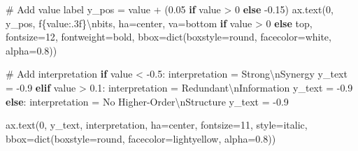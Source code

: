 \documentclass[
  11pt,
  letterpaper,
  oneside,
  openany]{book}
\newenvironment{Shaded}{\begin{snugshade}}{\end{snugshade}}
\newcommand{\BuiltInTok}[1]{\textcolor[rgb]{0.00,0.23,0.31}{#1}}
\newcommand{\CharTok}[1]{\textcolor[rgb]{0.13,0.47,0.30}{#1}}
\newcommand{\CommentTok}[1]{\textcolor[rgb]{0.37,0.37,0.37}{#1}}
\newcommand{\ControlFlowTok}[1]{\textcolor[rgb]{0.00,0.23,0.31}{\textbf{#1}}}
\newcommand{\DecValTok}[1]{\textcolor[rgb]{0.68,0.00,0.00}{#1}}
\newcommand{\FloatTok}[1]{\textcolor[rgb]{0.68,0.00,0.00}{#1}}
\newcommand{\NormalTok}[1]{\textcolor[rgb]{0.00,0.23,0.31}{#1}}
\newcommand{\OperatorTok}[1]{\textcolor[rgb]{0.37,0.37,0.37}{#1}}
\newcommand{\SpecialCharTok}[1]{\textcolor[rgb]{0.37,0.37,0.37}{#1}}
\newcommand{\SpecialStringTok}[1]{\textcolor[rgb]{0.13,0.47,0.30}{#1}}
\newcommand{\StringTok}[1]{\textcolor[rgb]{0.13,0.47,0.30}{#1}}
\begin{document}
\begin{Shaded}
\begin{Highlighting}[]
    \CommentTok{\# Add value label}
\NormalTok{    y\_pos }\OperatorTok{=}\NormalTok{ value }\OperatorTok{+}\NormalTok{ (}\FloatTok{0.05} \ControlFlowTok{if}\NormalTok{ value }\OperatorTok{\textgreater{}} \DecValTok{0} \ControlFlowTok{else} \OperatorTok{{-}}\FloatTok{0.15}\NormalTok{)}
\NormalTok{    ax.text(}\DecValTok{0}\NormalTok{, y\_pos, }\SpecialStringTok{f\textquotesingle{}}\SpecialCharTok{\{}\NormalTok{value}\SpecialCharTok{:.3f\}}\CharTok{\textbackslash{}n}\SpecialStringTok{bits\textquotesingle{}}\NormalTok{, ha}\OperatorTok{=}\StringTok{\textquotesingle{}center\textquotesingle{}}\NormalTok{, va}\OperatorTok{=}\StringTok{\textquotesingle{}bottom\textquotesingle{}} \ControlFlowTok{if}\NormalTok{ value }\OperatorTok{\textgreater{}} \DecValTok{0} \ControlFlowTok{else} \StringTok{\textquotesingle{}top\textquotesingle{}}\NormalTok{,}
\NormalTok{            fontsize}\OperatorTok{=}\DecValTok{12}\NormalTok{, fontweight}\OperatorTok{=}\StringTok{\textquotesingle{}bold\textquotesingle{}}\NormalTok{,}
\NormalTok{            bbox}\OperatorTok{=}\BuiltInTok{dict}\NormalTok{(boxstyle}\OperatorTok{=}\StringTok{\textquotesingle{}round\textquotesingle{}}\NormalTok{, facecolor}\OperatorTok{=}\StringTok{\textquotesingle{}white\textquotesingle{}}\NormalTok{, alpha}\OperatorTok{=}\FloatTok{0.8}\NormalTok{))}
    
    \CommentTok{\# Add interpretation}
    \ControlFlowTok{if}\NormalTok{ value }\OperatorTok{\textless{}} \OperatorTok{{-}}\FloatTok{0.5}\NormalTok{:}
\NormalTok{        interpretation }\OperatorTok{=} \StringTok{\textquotesingle{}Strong}\CharTok{\textbackslash{}n}\StringTok{Synergy\textquotesingle{}}
\NormalTok{        y\_text }\OperatorTok{=} \OperatorTok{{-}}\FloatTok{0.9}
    \ControlFlowTok{elif}\NormalTok{ value }\OperatorTok{\textgreater{}} \FloatTok{0.1}\NormalTok{:}
\NormalTok{        interpretation }\OperatorTok{=} \StringTok{\textquotesingle{}Redundant}\CharTok{\textbackslash{}n}\StringTok{Information\textquotesingle{}}
\NormalTok{        y\_text }\OperatorTok{=} \OperatorTok{{-}}\FloatTok{0.9}
    \ControlFlowTok{else}\NormalTok{:}
\NormalTok{        interpretation }\OperatorTok{=} \StringTok{\textquotesingle{}No Higher{-}Order}\CharTok{\textbackslash{}n}\StringTok{Structure\textquotesingle{}}
\NormalTok{        y\_text }\OperatorTok{=} \OperatorTok{{-}}\FloatTok{0.9}
    
\NormalTok{    ax.text(}\DecValTok{0}\NormalTok{, y\_text, interpretation, ha}\OperatorTok{=}\StringTok{\textquotesingle{}center\textquotesingle{}}\NormalTok{, fontsize}\OperatorTok{=}\DecValTok{11}\NormalTok{, style}\OperatorTok{=}\StringTok{\textquotesingle{}italic\textquotesingle{}}\NormalTok{,}
\NormalTok{            bbox}\OperatorTok{=}\BuiltInTok{dict}\NormalTok{(boxstyle}\OperatorTok{=}\StringTok{\textquotesingle{}round\textquotesingle{}}\NormalTok{, facecolor}\OperatorTok{=}\StringTok{\textquotesingle{}lightyellow\textquotesingle{}}\NormalTok{, alpha}\OperatorTok{=}\FloatTok{0.8}\NormalTok{))}
    

\end{Highlighting}
\end{Shaded}
\end{document}
